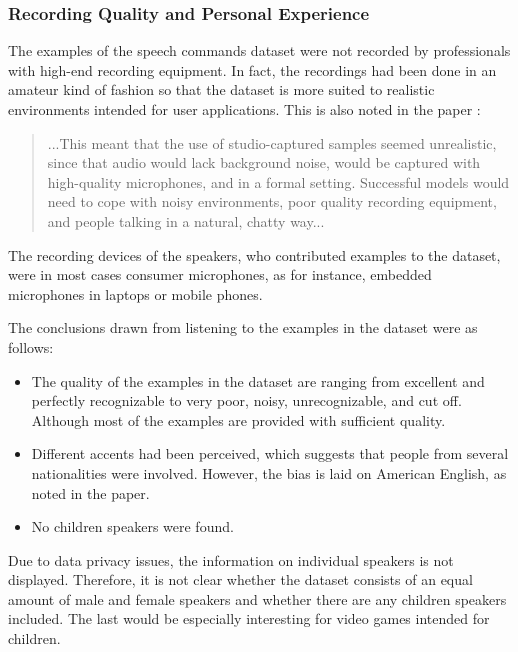 \subsubsection{Recording Quality and Personal Experience}
The examples of the speech commands dataset \cite{Warden2018} were not recorded by professionals with high-end recording equipment.
In fact, the recordings had been done in an amateur kind of fashion so that the dataset is more suited to realistic environments intended for user applications.
This is also noted in the paper \cite{Warden2018}:
\begin{quote}
...This meant that the use of studio-captured samples seemed unrealistic, since that audio would lack background noise, would be captured with high-quality microphones, and in a formal setting. 
Successful models would need to cope with noisy environments, poor quality recording equipment, and people talking in a natural, chatty way...
\end{quote}
The recording devices of the speakers, who contributed examples to the dataset, were in most cases consumer microphones, as for instance, embedded microphones in laptops or mobile phones.

The conclusions drawn from listening to the examples in the dataset were as follows:
\begin{itemize}
  \item The quality of the examples in the dataset are ranging from excellent and perfectly recognizable to very poor, noisy, unrecognizable, and cut off. Although most of the examples are provided with sufficient quality.
  \item Different accents had been perceived, which suggests that people from several nationalities were involved.
  However, the bias is laid on American English, as noted in the paper.
  \item No children speakers were found.
\end{itemize}
Due to data privacy issues, the information on individual speakers is not displayed.
Therefore, it is not clear whether the dataset consists of an equal amount of male and female speakers and whether there are any children speakers included.
The last would be especially interesting for video games intended for children.

